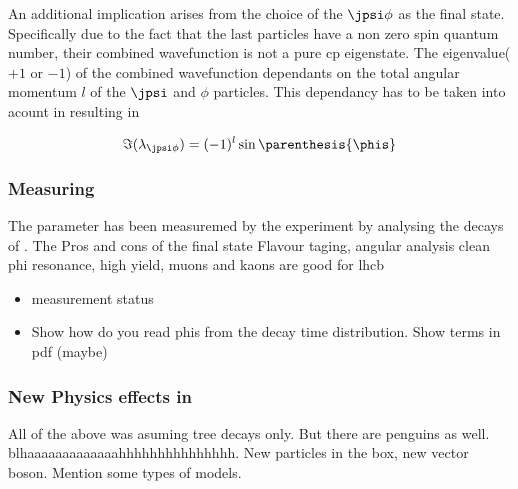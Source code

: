 \noindent An additional implication arises from the choice of the $\jpsi\phi$ as the final state.
Specifically due to the fact that the last particles have a non zero spin quantum number, their combined wavefunction
is not a pure cp eigenstate. The eigenvalue($+1$ or $-1$) of the combined wavefunction dependants on the total angular momentum
$l$ of the $\jpsi$ and $\phi$ particles. This dependancy has to be taken into acount in  resulting in 

\begin{equation}
 \Im(\lambda_{\jpsi\phi}) = (-1)^l\sin\parenthesis{\phis}
 \label{phis_jpsiphi_def}
\end{equation}


\subsubsection{Measuring \phis}

The parameter \phis has been measuremed by the \lhcb experiment by analysing the decays of \BsJpsiPhi.
The
Pros and cons of the final state
Flavour taging, angular analysis
clean phi resonance, high yield, muons and kaons are good for lhcb


\begin{itemize}
  \item \phis measurement status
  \item Show how do you read phis from the decay time distribution. Show terms in pdf (maybe)
\end{itemize}

\subsubsection{New Physics effects in \phis}
All of the above was asuming tree decays only. But there are penguins as well. blhaaaaaaaaaaaaahhhhhhhhhhhhhhh.
 New particles in the box, new vector boson. Mention some types of models.
